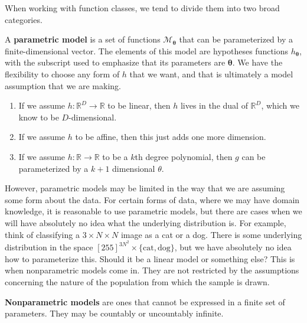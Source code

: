 \documentclass{article}
\begin{document}
  When working with function classes, we tend to divide them into two broad categories. 

  \begin{definition}
    A \textbf{parametric model} is a set of functions $\mathcal{M}_{\boldsymbol{\theta}}$ that can be parameterized by a finite-dimensional vector. The elements of this model are hypotheses functions $h_{\boldsymbol{\theta}}$, with the subscript used to emphasize that its parameters are $\boldsymbol{\theta}$. We have the flexibility to choose any form of $h$ that we want, and that is ultimately a model assumption that we are making. 
  \end{definition}

  \begin{example}
    \begin{enumerate}
      \item If we assume $h: \mathbb{R}^D \rightarrow \mathbb{R}$ to be linear, then $h$ lives in the dual of $\mathbb{R}^D$, which we know to be $D$-dimensional. 
      \item If we assume $h$ to be affine, then this just adds one more dimension. 
      \item If we assume $h: \mathbb{R} \rightarrow \mathbb{R}$ to be a $k$th degree polynomial, then $g$ can be parameterized by a $k+1$ dimensional $\theta$. 
    \end{enumerate}
  \end{example}

  However, parametric models may be limited in the way that we are assuming some form about the data. For certain forms of data, where we may have domain knowledge, it is reasonable to use parametric models, but there are cases when we will have absolutely no idea what the underlying distribution is. For example, think of classifying a $3 \times N \times N$ image as a cat or a dog. There is some underlying distribution in the space $[255]^{3 N^2} \times \{\text{cat}, \text{dog}\}$, but we have absolutely no idea how to parameterize this. Should it be a linear model or something else? This is when nonparametric models come in. They are not restricted by the assumptions concerning the nature of the population from which the sample is drawn. 

  \begin{definition}
    \textbf{Nonparametric models} are ones that cannot be expressed in a finite set of parameters. They may be countably or uncountably infinite. 
  \end{definition}
\end{document}
